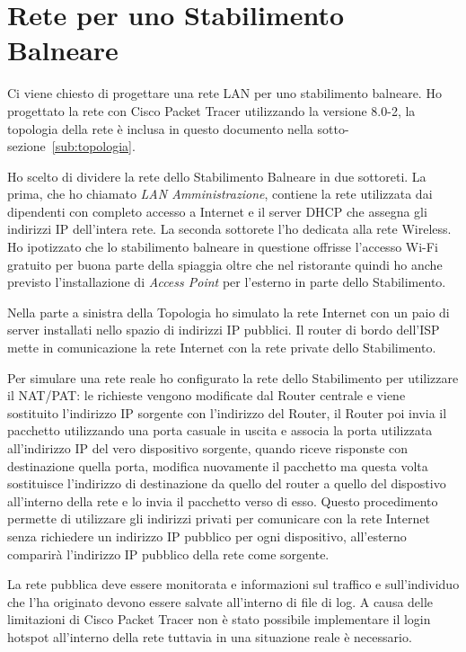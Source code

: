 \newpage
\section{Rete per uno Stabilimento Balneare}%
\label{sec:rete}

Ci viene chiesto di progettare una rete LAN per uno stabilimento balneare. Ho progettato la rete con Cisco Packet Tracer utilizzando la versione 8.0-2, la topologia della rete \`e inclusa in questo documento nella sotto-sezione~\ref{sub:topologia}.

Ho scelto di dividere la rete dello Stabilimento Balneare in due sottoreti. La prima, che ho chiamato \emph{LAN Amministrazione}, contiene la rete utilizzata dai dipendenti con completo accesso a Internet e il server DHCP che assegna gli indirizzi IP dell'intera rete. La seconda sottorete l'ho dedicata alla rete Wireless. Ho ipotizzato che lo stabilimento balneare in questione offrisse l'accesso Wi-Fi gratuito per buona parte della spiaggia oltre che nel ristorante quindi ho anche previsto l'installazione di \emph{Access Point} per l'esterno in parte dello Stabilimento.

Nella parte a sinistra della Topologia ho simulato la rete Internet con un paio di server installati nello spazio di indirizzi IP pubblici. Il router di bordo dell'ISP mette in comunicazione la rete Internet con la rete private dello Stabilimento.

Per simulare una rete reale ho configurato la rete dello Stabilimento per utilizzare il NAT/PAT\@: le richieste vengono modificate dal Router centrale e viene sostituito l'indirizzo IP sorgente con l'indirizzo del Router, il Router poi invia il pacchetto utilizzando una porta casuale in uscita e associa la porta utilizzata all'indirizzo IP del vero dispositivo sorgente, quando riceve risponste con destinazione quella porta, modifica nuovamente il pacchetto ma questa volta sostituisce l'indirizzo di destinazione da quello del router a quello del dispostivo all'interno della rete e lo invia il pacchetto verso di esso. Questo procedimento permette di utilizzare gli indirizzi privati per comunicare con la rete Internet senza richiedere un indirizzo IP pubblico per ogni dispositivo, all'esterno comparir\`a l'indirizzo IP pubblico della rete come sorgente.

La rete pubblica deve essere monitorata e informazioni sul traffico e sull'individuo che l'ha originato devono essere salvate all'interno di file di log. A causa delle limitazioni di Cisco Packet Tracer non \`e stato possibile implementare il login hotspot all'interno della rete tuttavia in una situazione reale \`e necessario.

